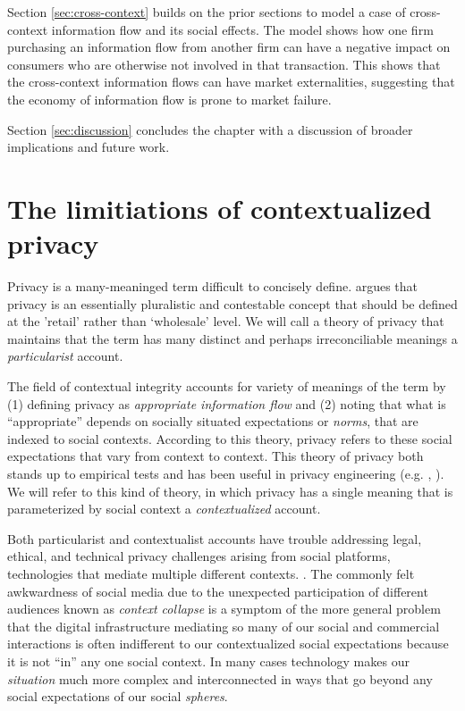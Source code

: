 \documentclass[../thesis.tex]{subfiles}
\begin{document}
Section \ref{sec:cross-context} builds on the prior
sections to model a case of cross-context information
flow and its social effects.
The model shows how one firm purchasing an information
flow from another firm can have a negative impact
on consumers who are otherwise not involved in that
transaction.
This shows that the cross-context information flows
can have market externalities, suggesting that
the economy of information flow is prone to market failure.

Section \ref{sec:discussion} concludes the chapter
with a discussion of broader implications and future
work.

\section{The limitiations of contextualized privacy}
\label{sec:limitations}

Privacy is a many-meaninged term
difficult \cite{solove2005taxonomy} to concisely define.
\cite{mulligan2016privacy} argues that privacy is an
essentially pluralistic and contestable
concept that should be defined at the 'retail' rather
than ‘wholesale’ level.
We will call a theory of privacy that maintains
that the term has many distinct and perhaps irreconciliable
meanings a \emph{particularist} account.

The field of contextual integrity \cite{nissenbaum09book}
accounts for variety of meanings of the term by
(1) defining privacy
as \emph{appropriate information flow} and
(2) noting
that what is ``appropriate'' depends on socially situated
expectations or \emph{norms}, that are indexed to social
contexts.
According to this theory, privacy refers to these
social expectations that vary from context
to context.
This theory of privacy both stands up to empirical tests
\cite{martin2016measuring} and has been useful in
privacy engineering (e.g. \cite{shvartzshnaider2016learning},
\cite{benthall2017contextual}).
We will refer to this kind of theory, in which
privacy has a single meaning that is parameterized
by social context a \emph{contextualized} account.

Both particularist and contextualist accounts have trouble addressing legal,
ethical, and technical privacy challenges arising from
social platforms, technologies
that mediate multiple different contexts.
\cite{benthall2017contextual}.
The commonly felt awkwardness of social media due to
the unexpected participation of different audiences
known as \emph{context collapse}
\cite{marwick2011tweet} \cite{davis2014context}
is a symptom of the more general problem
that the digital infrastructure mediating so many
of our social and commercial interactions
is often indifferent to our contextualized social
expectations because it is not ``in'' any one
social context.
In many cases technology makes our \emph{situation}
much more complex and interconnected in ways that
go beyond any social expectations of our social
\emph{spheres}.
\end{document}
